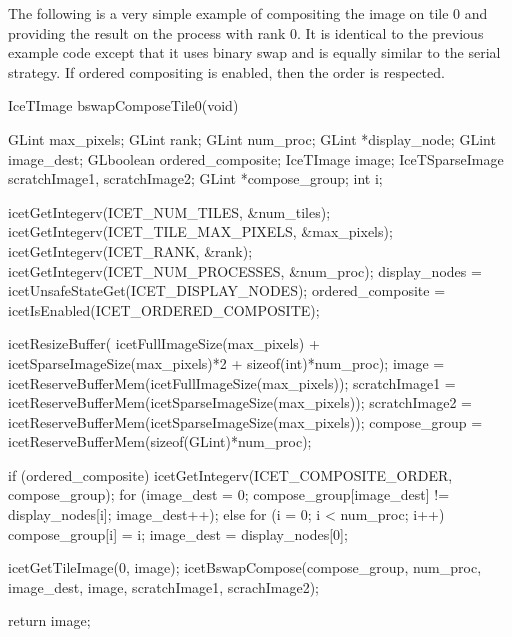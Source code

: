 The following is a very simple example of compositing the image on tile 0
and providing the result on the process with rank 0.  It is identical to
the previous example code except that it uses binary swap and is equally
similar to the serial strategy.  If ordered
compositing is enabled, then the order is respected.

\begin{code}
IceTImage bswapComposeTile0(void)
{
  GLint max_pixels;
  GLint rank;
  GLint num_proc;
  GLint *display_node;
  GLint image_dest;
  GLboolean ordered_composite;
  IceTImage image;
  IceTSparseImage scratchImage1, scratchImage2;
  GLint *compose_group;
  int i;

  icetGetIntegerv(ICET_NUM_TILES, &num_tiles);
  icetGetIntegerv(ICET_TILE_MAX_PIXELS, &max_pixels);
  icetGetIntegerv(ICET_RANK, &rank);
  icetGetIntegerv(ICET_NUM_PROCESSES, &num_proc);
  display_nodes = icetUnsafeStateGet(ICET_DISPLAY_NODES);
  ordered_composite = icetIsEnabled(ICET_ORDERED_COMPOSITE);

  icetResizeBuffer(  icetFullImageSize(max_pixels)
                   + icetSparseImageSize(max_pixels)*2
                   + sizeof(int)*num_proc);
  image         = icetReserveBufferMem(icetFullImageSize(max_pixels));
  scratchImage1 = icetReserveBufferMem(icetSparseImageSize(max_pixels));
  scratchImage2 = icetReserveBufferMem(icetSparseImageSize(max_pixels));
  compose_group = icetReserveBufferMem(sizeof(GLint)*num_proc);

  if (ordered_composite) {
    icetGetIntegerv(ICET_COMPOSITE_ORDER, compose_group);
    for (image_dest = 0; compose_group[image_dest] != display_nodes[i];
         image_dest++);
  } else {
    for (i = 0; i < num_proc; i++) {
      compose_group[i] = i;
    }
    image_dest = display_nodes[0];
  }

  icetGetTileImage(0, image);
  icetBswapCompose(compose_group, num_proc, image_dest, image,
                   scratchImage1, scrachImage2);

  return image;
}
\end{code}

